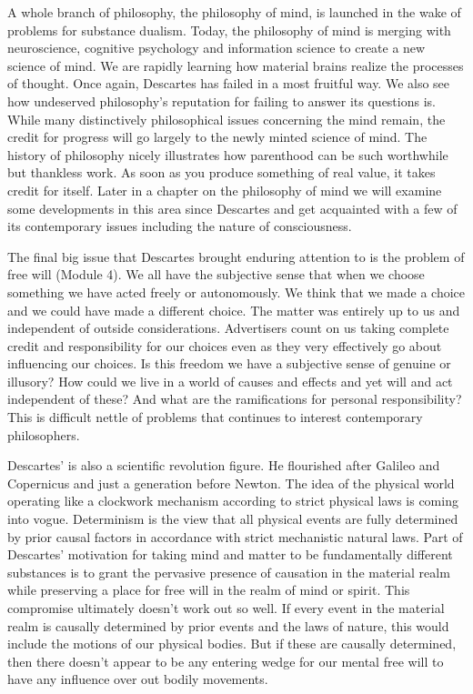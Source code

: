 A whole branch of philosophy, the philosophy of mind, is launched in the wake of problems for substance dualism. Today, the philosophy of mind is merging with neuroscience, cognitive psychology and information science to create a new science of mind. We are rapidly learning how material brains realize the processes of thought. Once again, Descartes has failed in a most fruitful way. We also see how undeserved philosophy’s reputation for failing to answer its questions is. While many distinctively philosophical issues concerning the mind remain, the credit for progress will go largely to the newly minted science of mind. The history of philosophy nicely illustrates how parenthood can be such worthwhile but thankless work. As soon as you produce something of real value, it takes credit for itself. Later in a chapter on the philosophy of mind we will examine some developments in this area since Descartes and get acquainted with a few of its contemporary issues including the nature of consciousness.

The final big issue that Descartes brought enduring attention to is the problem of free will (Module 4). We all have the subjective sense that when we choose something we have acted freely or autonomously. We think that we made a choice and we could have made a different choice. The matter was entirely up to us and independent of outside considerations. Advertisers count on us taking complete credit and responsibility for our choices even as they very effectively go about influencing our choices. Is this freedom we have a subjective sense of genuine or illusory? How could we live in a world of causes and effects and yet will and act independent of these? And what are the ramifications for personal responsibility? This is difficult nettle of problems that continues to interest contemporary philosophers.

Descartes’ is also a scientific revolution figure. He flourished after Galileo and Copernicus and just a generation before Newton. The idea of the physical world operating like a clockwork mechanism according to strict physical laws is coming into vogue. Determinism is the view that all physical events are fully determined by prior causal factors in accordance with strict mechanistic natural laws. Part of Descartes’ motivation for taking mind and matter to be fundamentally different substances is to grant the pervasive presence of causation in the material realm while preserving a place for free will in the realm of mind or spirit. This compromise ultimately doesn’t work out so well. If every event in the material realm is causally determined by prior events and the laws of nature, this would include the motions of our physical bodies. But if these are causally determined, then there doesn’t appear to be any entering wedge for our mental free will to have any influence over out bodily movements.

